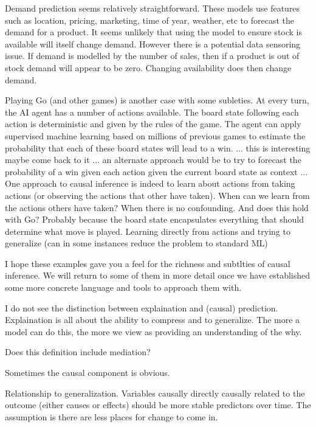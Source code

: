 \documentclass[11pt,a4paper]{article}
\begin{document}
Demand prediction seems relatively straightforward. These models use features such as location, pricing, marketing, time of year, weather, etc to forecast the demand for a product. It seems unlikely that using the model to ensure stock is available will itself change demand. However there is a potential data sensoring issue. If demand is modelled by the number of sales, then if a product is out of stock demand will appear to be zero. Changing availability does then change demand.
   

Playing Go (and other games) is another case with some subleties. At every turn, the AI agent has a number of actions available. The board state following each action is deterministic and given by the rules of the game. The agent can apply supervised machine learning based on millions of previous games to estimate the probability that each of these board states will lead to a win. ... this is interesting maybe come back to it ... an alternate approach would be to try to forecast the probability of a win given each action given the current board state as context ... One approach to causal inference is indeed to learn about actions from taking actions (or observing the actions that other have taken). When can we learn from the actions others have taken? When there is no confounding. And does this hold with Go? Probably because the board state encapsulates everything that should determine what move is played. Learning directly from actions and trying to generalize (can in some instances reduce the problem to standard ML)


I hope these examples gave you a feel for the richness and subtlties of causal inference. We will return to some of them in more detail once we have established some more concrete language and tools to approach them with.



I do not see the distinction between explaination and (causal) prediction. Explaination is all about the ability to compress and to generalize. The more a model can do this, the more we view as providing an understanding of the why. 

Does this definition include mediation?

Sometimes the causal component is obvious. 

Relationship to generalization. Variables causally directly causally related to the outcome (either causes or effects) should be more stable predictors over time. The assumption is there are less places for change to come in. 
\end{document}

